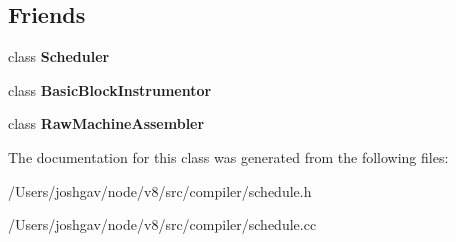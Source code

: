 \subsection*{Friends}
\begin{DoxyCompactItemize}
\item 
class {\bfseries Scheduler}\hypertarget{classv8_1_1internal_1_1compiler_1_1_schedule_afb88c77ea5daaefa6c8fa6bc5b9aa5c1}{}\label{classv8_1_1internal_1_1compiler_1_1_schedule_afb88c77ea5daaefa6c8fa6bc5b9aa5c1}

\item 
class {\bfseries Basic\+Block\+Instrumentor}\hypertarget{classv8_1_1internal_1_1compiler_1_1_schedule_a5c39b0bbc0c1cfdda659556340bdcea9}{}\label{classv8_1_1internal_1_1compiler_1_1_schedule_a5c39b0bbc0c1cfdda659556340bdcea9}

\item 
class {\bfseries Raw\+Machine\+Assembler}\hypertarget{classv8_1_1internal_1_1compiler_1_1_schedule_a14407edaf8af33febf237ed95c292a7a}{}\label{classv8_1_1internal_1_1compiler_1_1_schedule_a14407edaf8af33febf237ed95c292a7a}

\end{DoxyCompactItemize}


The documentation for this class was generated from the following files\+:\begin{DoxyCompactItemize}
\item 
/\+Users/joshgav/node/v8/src/compiler/schedule.\+h\item 
/\+Users/joshgav/node/v8/src/compiler/schedule.\+cc\end{DoxyCompactItemize}
